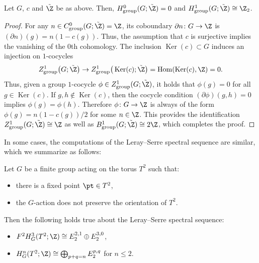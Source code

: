 \begin{lem} \label{lem:group_coh_orientation_coeff}
Let $G$, $c$ and $\tilde{\Z}$ be as above. Then, $H^0_{\mathrm{group}}(G; \tilde{\Z}) = 0$ and $H^1_{\mathrm{group}}(G; \tilde{\Z}) \cong \Z_2$.
\end{lem}

\begin{proof}For any $n \in C^0_{\mathrm{group}}(G; \tilde{\Z}) = \Z$, its coboundary $\partial n\colon G \to \Z$ is $(\partial n)(g) = n(1 - c(g))$. Thus, the assumption that $c$ is surjective implies the vanishing of the $0$th cohomology. The inclusion $\operatorname{Ker}(c) \subset G$ induces an injection on $1$-cocycles
\begin{gather*}
Z^1_{\mathrm{group}}\big(G; \tilde{\Z}\big) \to Z^1_{\mathrm{group}}\big(\operatorname{Ker}(c); \tilde{\Z}\big) = \operatorname{Hom}(\operatorname{Ker}(c), \Z) = 0.
\end{gather*}
Thus, given a group $1$-cocycle $\phi \in Z^1_{\mathrm{group}}(G; \tilde{\Z})$, it holds that $\phi(g) = 0$ for all $g \in \operatorname{Ker}(c)$. If $g, h \not\in \operatorname{Ker}(c)$, then the cocycle condition $(\partial \phi)(g, h) = 0$ implies $\phi(g) = \phi(h)$. Therefore $\phi \colon G \to \Z$ is always of the form $\phi(g) = n (1 - c(g))/2$ for some $n \in \Z$. This provides the identif\/ication $Z^1_{\mathrm{group}}(G; \tilde{\Z}) \cong \Z$ as well as $B^1_{\mathrm{group}}(G; \tilde{\Z}) \cong 2\Z$, which completes the proof.
\end{proof}

In some cases, the computations of the Leray--Serre spectral sequence are similar, which we summarize as follows:

\begin{lem} \label{lem:typical_argument_non_orientation_preserving_case}
Let $G$ be a finite group acting on the torus $T^2$ such that:
\begin{itemize}\itemsep=0pt
\item there is a fixed point $\pt \in T^2$,

\item the $G$-action does not preserve the orientation of $T^2$.
\end{itemize}
Then the following holds true about the Leray--Serre spectral sequence:
\begin{itemize}\itemsep=0pt
\item[$(a)$] $F^2H^3_G(T^2; \Z) \cong E_2^{2, 1} \oplus E_2^{3, 0}$,

\item[$(b)$] $H^n_G(T^2; \Z) \cong \bigoplus_{p + q = n} E_2^{p, q}$ for $n \le 2$.
\end{itemize}
\end{lem}

